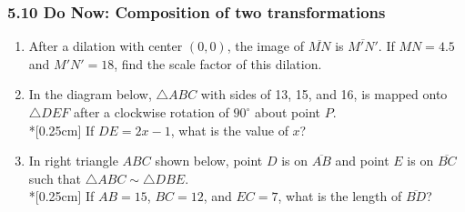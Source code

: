 \documentclass[12pt, twoside]{article}
\begin{document}
\subsubsection*{5.10 Do Now: Composition of two transformations}
  \begin{enumerate}

  \item After a dilation with center $(0,0)$, the image of $\overline{MN}$ is $\overline{M'N'}$. If $MN=4.5$ and $M'N'=18$, find the scale factor of this dilation. \vspace{3cm}

  \item In the diagram below, $\triangle ABC$ with sides of 13, 15, and 16, is mapped onto $\triangle DEF$ after a clockwise rotation of $90^\circ$ about point $P$. \\*[0.25cm]
  If $DE=2x-1$, what is the value of $x$? 
      \begin{flushright}
      \end{flushright}
    \vspace{2cm}

  \item In right triangle $ABC$ shown below, point $D$ is on $\overline{AB}$ and point $E$ is on $\overline{BC}$ such that $\triangle ABC \sim \triangle DBE$. \\*[0.25cm]
  If $AB=15$, $BC=12$, and $EC=7$, what is the length of $\overline{BD}$?
    \begin{flushright}
    \end{flushright}
    

\end{enumerate}
\end{document}
